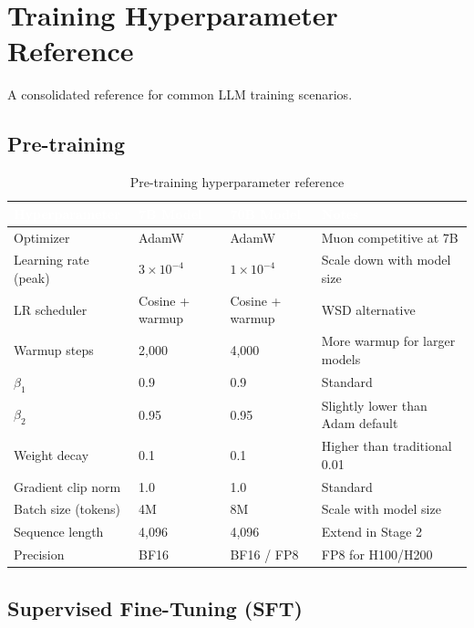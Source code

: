\chapter{Training Hyperparameter Reference}

A consolidated reference for common LLM training scenarios.

\section{Pre-training}

\begin{table}[H]
\centering\small\sffamily
{}
\begin{tabular}{L{3.5cm}L{2.5cm}L{2.5cm}L{3cm}}
\toprule
{}\textcolor{white}{\textbf{Hyperparameter}} & \textcolor{white}{\textbf{7B Model}} & \textcolor{white}{\textbf{70B Model}} & \textcolor{white}{\textbf{Notes}} \\
\midrule
Optimizer & AdamW & AdamW & Muon competitive at 7B \\
Learning rate (peak) & $3\times10^{-4}$ & $1\times10^{-4}$ & Scale down with model size \\
LR scheduler & Cosine + warmup & Cosine + warmup & WSD alternative \\
Warmup steps & 2,000 & 4,000 & More warmup for larger models \\
$\beta_1$ & 0.9 & 0.9 & Standard \\
$\beta_2$ & 0.95 & 0.95 & Slightly lower than Adam default \\
Weight decay & 0.1 & 0.1 & Higher than traditional 0.01 \\
Gradient clip norm & 1.0 & 1.0 & Standard \\
Batch size (tokens) & 4M & 8M & Scale with model size \\
Sequence length & 4,096 & 4,096 & Extend in Stage 2 \\
Precision & BF16 & BF16 / FP8 & FP8 for H100/H200 \\
\bottomrule
\end{tabular}
\caption{Pre-training hyperparameter reference}
\end{table}

\section{Supervised Fine-Tuning (SFT)}

